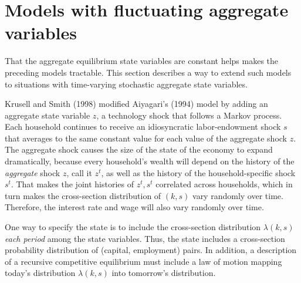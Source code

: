 \section{Models with fluctuating aggregate variables}
  That the aggregate equilibrium state variables are constant helps
makes the preceding models tractable.  This section describes a way to
extend such models to situations with time-varying stochastic aggregate
state variables.
      
         

  Krusell and Smith (1998) modified Aiyagari's (1994) model
by adding an aggregate state variable $z$, a technology shock
that follows a Markov process.  Each household continues
to receive  an idiosyncratic labor-endowment shock $s$ that
averages to the same constant value for each value  of the aggregate shock
$z$.  The aggregate shock causes the size of the state of the
economy to expand dramatically, because every household's wealth
will depend on the history of the {\it aggregate\/} shock $z$, call it
$z^t$, as well as the history of the household-specific shock $s^t$.
That makes the joint histories of $z^t,s^t$ correlated across households,
which in turn makes the cross-section distribution of $(k,s)$ vary
randomly over time.  Therefore, the interest rate and wage will also vary
randomly over time.

  One way to specify the state is to include the cross-section distribution
$\lambda(k,s)$  {\it each period\/} among the state variables.  Thus, the
state includes a cross-section probability distribution of
(capital, employment) pairs.  In addition, a description of a recursive
competitive equilibrium must include a law of motion mapping today's
distribution $\lambda(k,s)$ into tomorrow's distribution.

